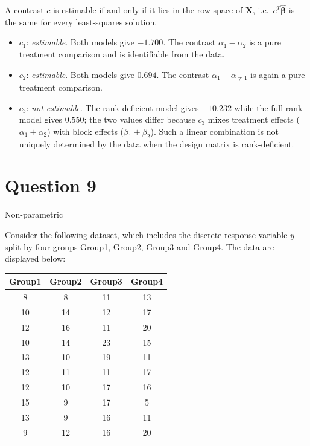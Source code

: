 \documentclass[letterpaper]{article}
\begin{document}
				A contrast $c$ is {estimable} if and only if it lies in the row
				space of $\mathbf{X}$, i.e.\ $c^T\hat{\boldsymbol{\beta}}$ is the same
				for every least-squares solution.
				
				\begin{itemize}
					\item $c_1$: \textit{estimable}. Both models give $-1.700$. The contrast
					$\alpha_1-\alpha_2$ is a pure treatment comparison and is
					identifiable from the data.
					
					\item $c_2$: \textit{estimable}. Both models give $0.694$. The
					contrast $\alpha_1 - \bar\alpha_{\neq 1}$ is again a pure
					treatment comparison.
					
					\item $c_3$: \textit{not estimable}. The rank-deficient model gives
					$-10.232$ while the full-rank model gives $0.550$; the two
					values differ because $c_3$ mixes treatment effects
					($\alpha_1+\alpha_2$) with block effects ($\beta_1+\beta_2$).
					Such a linear combination is not uniquely determined by the
					data when the design matrix is rank-deficient.
				\end{itemize}
		
		\clearpage
		
		\section{Question 9}
		{\color{deepred}   Non-parametric}
		
		Consider the following dataset, which includes the discrete response variable $y$ split by four groups Group1, Group2, Group3 and Group4. The data are displayed below:
		
		\begin{center}
			\begin{tabular}{c c c c}
				\hline
				Group1 & Group2 & Group3 & Group4 \\
				\hline
				8  & 8  & 11 & 13 \\
				10 & 14 & 12 & 17 \\
				12 & 16 & 11 & 20 \\
				10 & 14 & 23 & 15 \\
				13 & 10 & 19 & 11 \\
				12 & 11 & 11 & 17 \\
				12 & 10 & 17 & 16 \\
				15 & 9  & 17 & 5 \\
				13 & 9  & 16 & 11 \\
				9  & 12 & 16 & 20 \\
				\hline
			\end{tabular}
		\end{center}
		
\end{document}
